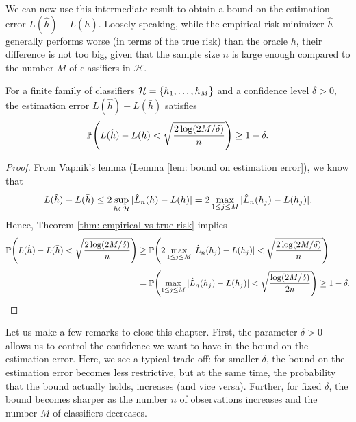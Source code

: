 We can now use this intermediate result to obtain a bound on the estimation error $L(\hat{h}) - L(\bar{h})$. Loosely speaking, while the empirical risk minimizer $\hat{h}$ generally performs worse (in terms of the true risk) than the oracle $\bar{h}$, their difference is not too big, given that the sample size $n$ is large enough compared to the number $M$ of classifiers in $\mathcal{H}$.

\begin{theorem}
\label{thm: estimation error finite dictionary}
For a finite family of classifiers $\mathcal{H} = \set{h_1, \dots, h_M}$ and a confidence level $\delta > 0$, the estimation error $L(\hat{h}) - L(\bar{h})$ satisfies
\[
    \Prob\left(L(\hat{h}) - L(\bar{h}) < \sqrt{\frac{2 \log(2M / \delta)}{n}}\right) \geq 1 - \delta.
\]
\end{theorem}

\begin{proof}
From Vapnik's lemma (Lemma \ref{lem: bound on estimation error}), we know that
\[
    L(\hat{h}) - L(\bar{h}) \leq 2 \sup_{h \in \mathcal{H}} \abs*{\hat{L}_n(h) - L(h)} = 2 \max_{1 \leq j \leq M} \abs*{\hat{L}_n(h_j) - L(h_j)}.
\]
Hence, Theorem \ref{thm: empirical vs true risk} implies
\begin{align*}
    \Prob\left(L(\hat{h}) - L(\bar{h}) < \sqrt{\frac{2 \log(2M / \delta)}{n}}\right) &\geq \Prob\left(2 \max_{1 \leq j \leq M} \abs*{\hat{L}_n(h_j) - L(h_j)} < \sqrt{\frac{2 \log(2M / \delta)}{n}}\right) \\[4pt]
    &= \Prob\left(\max_{1 \leq j \leq M} \abs*{\hat{L}_n(h_j) - L(h_j)} < \sqrt{\frac{\log(2M / \delta)}{2n}}\right) \geq 1 - \delta. \qedhere
\end{align*}
\end{proof}

Let us make a few remarks to close this chapter. First, the parameter $\delta > 0$ allows us to control the confidence we want to have in the bound on the estimation error. Here, we see a typical trade-off: for smaller $\delta$, the bound on the estimation error becomes less restrictive, but at the same time, the probability that the bound actually holds, increases (and vice versa). Further, for fixed $\delta$, the bound becomes sharper as the number $n$ of observations increases and the number $M$ of classifiers decreases.
